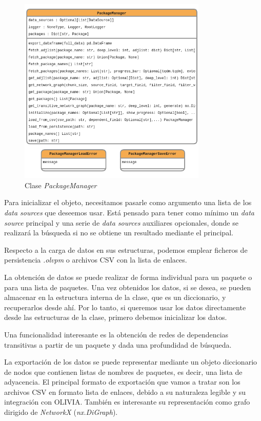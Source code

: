 \begin{figure}[ht!]
    \centering
    \includegraphics[width=0.8\textwidth]{img/anexos/package_manager.png}
    \caption{Clase \textit{PackageManager}}
    \label{fig:package_manager}
\end{figure}

Para inicializar el objeto, necesitamos pasarle como argumento una lista de los \textit{data sources}
que deseemos usar. Está pensado para tener como mínimo un \textit{data source} principal y una serie
de \textit{data sources} auxiliares opcionales, donde se realizará la búsqueda si no se obtiene un
resultado mediante el principal.

Respecto a la carga de datos en sus estructuras, podemos emplear ficheros de
persistencia \textit{.olvpm} o archivos CSV con la lista de enlaces.

La obtención de datos se puede realizar de forma individual para un paquete o para una lista de
paquetes. Una vez obtenidos los datos, si se desea, se pueden almacenar en la estructura interna
de la clase, que es un diccionario, y recuperarlos desde ahí. Por lo tanto, si queremos usar los
datos directamente desde las estructuras de la clase, primero debemos inicializar los datos.

Una funcionalidad interesante es la obtención de redes de dependencias transitivas a partir de un
paquete y dada una profundidad de búsqueda.

La exportación de los datos se puede representar mediante un objeto diccionario de nodos que
contienen listas de nombres de paquetes, es decir, una lista de adyacencia. El principal formato
de exportación que vamos a tratar son los archivos CSV en formato lista de enlaces, debido a su
naturaleza legible y su integración con OLIVIA. También es interesante su representación como
grafo dirigido de \textit{NetworkX} (\textit{nx.DiGraph}).

